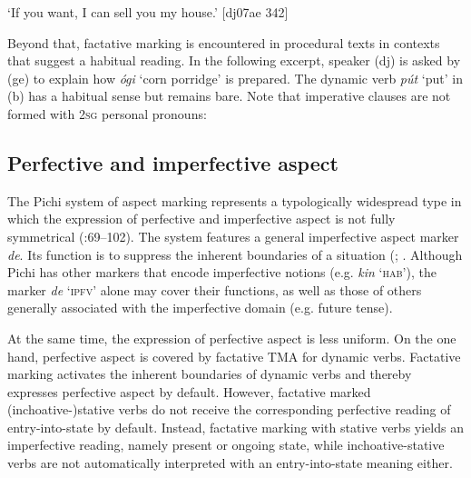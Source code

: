 \glt ‘If you want, I can sell you my house.’ [dj07ae 342]
\z

Beyond that, factative marking is encountered in procedural texts in contexts that suggest a habitual reading. In the following excerpt, speaker (dj) is asked by (ge) to explain how \textit{ógi} ‘corn porridge’ is prepared. The dynamic verb \textit{pút} ‘put’ in (b) has a habitual sense but remains bare. Note that imperative clauses are not formed with \textsc{2sg} personal pronouns:


\ea%
    \label{ex:key:322}
\z
\z

\subsection{Perfective and imperfective aspect}\label{sec:6.3.2}

The Pichi system of aspect marking represents a typologically widespread type in which the expression of perfective and imperfective aspect is not fully symmetrical (\citealt{Dahl1985}:69–102). The system features a general imperfective aspect marker \textit{de}. Its function is to suppress the inherent boundaries of a situation (\citealt{Breu1985}; \citealt{Sasse1991b,Sasse1991a}. Although Pichi has other markers that encode imperfective notions (e.g. \textit{kin} ‘\textsc{hab}’), the marker \textit{de} ‘\textsc{ipfv}’ alone may cover their functions, as well as those of others generally associated with the imperfective domain (e.g. future tense). 


At the same time, the expression of perfective aspect is less uniform. On the one hand, perfective aspect is covered by factative TMA for dynamic verbs. Factative marking activates the inherent boundaries of dynamic verbs and thereby expresses perfective aspect by default. However, factative marked (inchoative-)stative verbs do not receive the corresponding perfective reading of entry-into-state by default. Instead, factative marking with stative verbs yields an imperfective reading, namely present or ongoing state, while inchoative-stative verbs are not automatically interpreted with an entry-into-state meaning either. 



